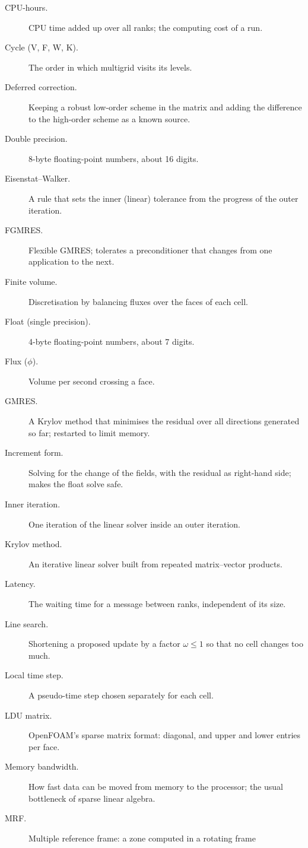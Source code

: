 \documentclass[11pt,a4paper]{article}
\begin{document}
\begin{description}
\item[CPU-hours.] CPU time added up over all ranks; the computing cost of a
  run.
\item[Cycle (V, F, W, K).] The order in which multigrid visits its levels.
\item[Deferred correction.] Keeping a robust low-order scheme in the matrix
  and adding the difference to the high-order scheme as a known source.
\item[Double precision.] 8-byte floating-point numbers, about 16 digits.
\item[Eisenstat--Walker.] A rule that sets the inner (linear) tolerance
  from the progress of the outer iteration.
\item[FGMRES.] Flexible GMRES; tolerates a preconditioner that changes from
  one application to the next.
\item[Finite volume.] Discretisation by balancing fluxes over the faces of
  each cell.
\item[Float (single precision).] 4-byte floating-point numbers, about 7
  digits.
\item[Flux ($\phi$).] Volume per second crossing a face.
\item[GMRES.] A Krylov method that minimises the residual over all
  directions generated so far; restarted to limit memory.
\item[Increment form.] Solving for the change of the fields, with the
  residual as right-hand side; makes the float solve safe.
\item[Inner iteration.] One iteration of the linear solver inside an outer
  iteration.
\item[Krylov method.] An iterative linear solver built from repeated
  matrix--vector products.
\item[Latency.] The waiting time for a message between ranks, independent
  of its size.
\item[Line search.] Shortening a proposed update by a factor $\omega\le1$ so
  that no cell changes too much.
\item[Local time step.] A pseudo-time step chosen separately for each cell.
\item[LDU matrix.] OpenFOAM's sparse matrix format: diagonal, and upper and
  lower entries per face.
\item[Memory bandwidth.] How fast data can be moved from memory to the
  processor; the usual bottleneck of sparse linear algebra.
\item[MRF.] Multiple reference frame: a zone computed in a rotating frame

\end{description}
\end{document}
